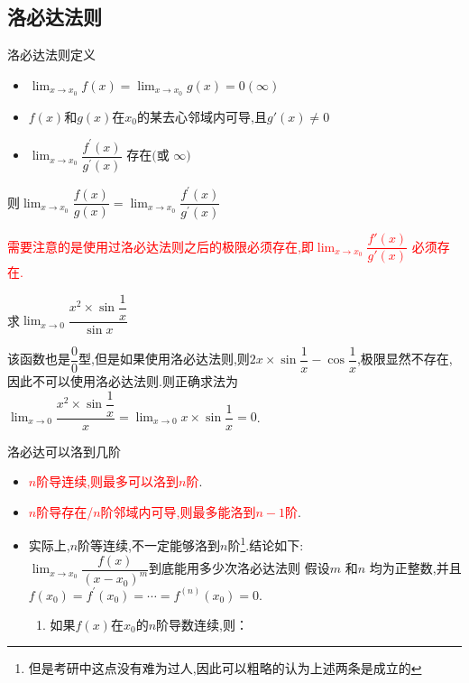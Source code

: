 \documentclass[8pt a4paper, oneside, UTF8]{ctexbook}
\begin{document}
\begin{sloppypar}
    \subsection{洛必达法则}
    \begin{defn}{洛必达法则定义}{}
        \begin{itemize}
            \item $\lim_{x\to x_0}f(x)=\lim_{x\to x_0}g(x)=0(\infty)$
            \item $f(x)$和$g(x)$在$x_0$的某去心邻域内可导,且$g'(x) \neq 0$
            \item $\lim_{x\to x_0}\dfrac{f^{\prime}(x)}{g^{\prime}(x)}\text{ 存在(或 }\infty)$
        \end{itemize}
        则$\lim_{x\to x_{0}}\dfrac{f(x)}{g(x)}=\lim_{x\to x_{0}}\dfrac{f^{'}(x)}{g^{'}(x)}$
    \end{defn}
    \textcolor{red}{需要注意的是使用过洛必达法则之后的极限必须存在,即$\lim _{x \to x_0}\dfrac{f'(x)}{g'(x)}$ 必须存在.}
    \begin{problem}
    求$\lim _{x \to 0}\dfrac{x^2 \times \sin \dfrac{1}{x}}{\sin x}$
    \end{problem}
    \begin{solution}
        该函数也是$\dfrac{0}{0}$型,但是如果使用洛必达法则,则$2x \times \sin \dfrac{1}{x}-\cos \dfrac{1}{x}$,极限显然不存在,因此不可以使用洛必达法则.则正确求法为$\lim _{x\to 0}\dfrac{x^2\times \sin \dfrac{1}{x}}{x}=\lim_{x\to 0}x\times\sin\dfrac{1}{x}=0$.
    \end{solution}
    \begin{conclusion}{洛必达可以洛到几阶}{}
        \begin{itemize}
            \item \textcolor{red}{$n$阶导连续,则最多可以洛到$n$阶}.
            \item \textcolor{red}{$n$阶导存在/$n$阶邻域内可导,则最多能洛到$n-1$阶}.
            \item 实际上,$n$阶等连续,不一定能够洛到$n$阶\footnote{但是考研中这点没有难为过人,因此可以粗略的认为上述两条是成立的}.结论如下:\\
            $\lim_{x\to x_0}\dfrac{f(x)}{\left(x-x_0\right)^m}$到底能用多少次洛必达法则
            假设$m$ 和$n$ 均为正整数,并且 $f(x_0)=f^{\prime}(x_0)=\cdots=f^{(n)}(x_0)=0.$ 
            \begin{enumerate}
                \item 如果$f(x)$在$x_0$的$n$阶导数连续,则：
                    \begin{enumerate}

\end{enumerate}
\end{enumerate}
\end{itemize}
\end{conclusion}
\end{sloppypar}
\end{document}
